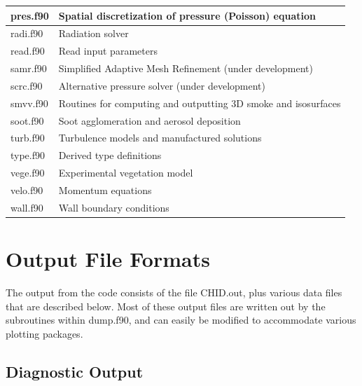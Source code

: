 \documentclass[11pt]{book}
\begin{document}
\begin{table}[ht]
\begin{center}
\begin{tabular}{|l|l|}
{\ct pres.f90}   & Spatial discretization of pressure (Poisson) equation \\ \hline
{\ct radi.f90}   & Radiation solver  \\ \hline
{\ct read.f90}   & Read input parameters \\ \hline
{\ct samr.f90}   & Simplified Adaptive Mesh Refinement (under development) \\ \hline
{\ct scrc.f90}   & Alternative pressure solver (under development) \\ \hline
{\ct smvv.f90}   & Routines for computing and outputting 3D smoke and isosurfaces \\ \hline
{\ct soot.f90}   & Soot agglomeration and aerosol deposition \\ \hline
{\ct turb.f90}   & Turbulence models and manufactured solutions \\ \hline
{\ct type.f90}   & Derived type definitions \\ \hline
{\ct vege.f90}   & Experimental vegetation model \\ \hline
{\ct velo.f90}   & Momentum equations \\ \hline
{\ct wall.f90}   & Wall boundary conditions \\ \hline
\end{tabular}
\end{center}
\end{table}





\chapter{Output File Formats}

The output from the code consists of the file {\ct CHID.out}, plus various data files that are described below. Most of these output files are written out by the subroutines within {\ct dump.f90}, and can easily be modified to accommodate various plotting packages.

\section{Diagnostic Output}
\label{out:file}
\end{document}

